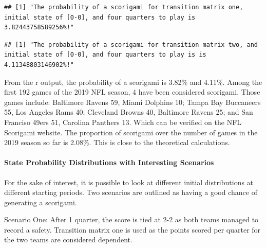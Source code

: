 \documentclass[
]{article}
\newenvironment{Shaded}{\begin{snugshade}}{\end{snugshade}}
\newcommand{\DataTypeTok}[1]{\textcolor[rgb]{0.13,0.29,0.53}{#1}}
\newcommand{\DecValTok}[1]{\textcolor[rgb]{0.00,0.00,0.81}{#1}}
\newcommand{\KeywordTok}[1]{\textcolor[rgb]{0.13,0.29,0.53}{\textbf{#1}}}
\newcommand{\NormalTok}[1]{#1}
\newcommand{\OperatorTok}[1]{\textcolor[rgb]{0.81,0.36,0.00}{\textbf{#1}}}
\newcommand{\StringTok}[1]{\textcolor[rgb]{0.31,0.60,0.02}{#1}}
\let\oldparagraph\paragraph
\renewcommand{\paragraph}[1]{\oldparagraph{#1}\mbox{}}
\begin{document}
\begin{verbatim}
## [1] "The probability of a scorigami for transition matrix one, initial state of [0-0], and four quarters to play is 3.82443758589256%!"
\end{verbatim}

\begin{Shaded}
\end{Shaded}

\begin{verbatim}
## [1] "The probability of a scorigami for transition matrix two, and initial state of [0-0], and four quarters to play is is 4.11348803146902%!"
\end{verbatim}

From the r output, the probability of a scorigami is 3.82\% and 4.11\%.
Among the first 192 games of the 2019 NFL season, 4 have been considered
scorigami. Those games include: Baltimore Ravens 59, Miami Dolphins 10;
Tampa Bay Buccaneers 55, Los Angeles Rams 40; Cleveland Browns 40,
Baltimore Ravens 25; and San Franciso 49ers 51, Carolina Panthers 13.
Which can be verified on the NFL Scorigami website. The proportion of
scorigami over the number of games in the 2019 season so far is 2.08\%.
This is close to the theoretical calculations.

\hypertarget{state-probability-distributions-with-interesting-scenarios}{%
\paragraph{State Probability Distributions with Interesting
Scenarios}\label{state-probability-distributions-with-interesting-scenarios}}

For the sake of interest, it is possible to look at different initial
distributions at different starting periods. Two scenarios are outlined
as having a good chance of generating a scorigami.

Scenario One: After 1 quarter, the score is tied at 2-2 as both teams
managed to record a safety. Transition matrix one is used as the points
scored per quarter for the two teams are considered dependent.
\end{document}
